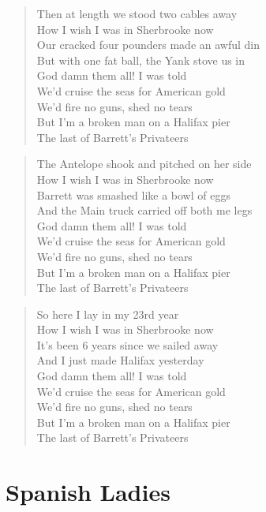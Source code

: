 \documentclass[8pt,twoside]{extarticle}
\newenvironment{xverse}{
	\penalty 10000
	\begin{verse}
	\parskip 4pt
	}
	{
	\end{verse}
	\penalty 0
	}
\begin{document}
\begin{xverse}
Then at length we stood two cables away \\
How I wish I was in Sherbrooke now \\
Our cracked four pounders made an awful din \\
But with one fat ball, the Yank stove us in \\
God damn them all! I was told \\
We'd cruise the seas for American gold \\
We'd fire no guns, shed no tears \\
But I'm a broken man on a Halifax pier \\
The last of Barrett's Privateers \\
\end{xverse}

\begin{xverse}
The Antelope shook and pitched on her side \\
How I wish I was in Sherbrooke now \\
Barrett was smashed like a bowl of eggs \\
And the Main truck carried off both me legs \\
God damn them all! I was told \\
We'd cruise the seas for American gold \\
We'd fire no guns, shed no tears \\
But I'm a broken man on a Halifax pier \\
The last of Barrett's Privateers \\
\end{xverse}

\begin{xverse}
So here I lay in my 23rd year \\
How I wish I was in Sherbrooke now \\
It's been 6 years since we sailed away \\
And I just made Halifax yesterday \\
God damn them all! I was told \\
We'd cruise the seas for American gold \\
We'd fire no guns, shed no tears \\
But I'm a broken man on a Halifax pier \\
The last of Barrett's Privateers \\
\end{xverse}


\section{Spanish Ladies}
\end{document}

